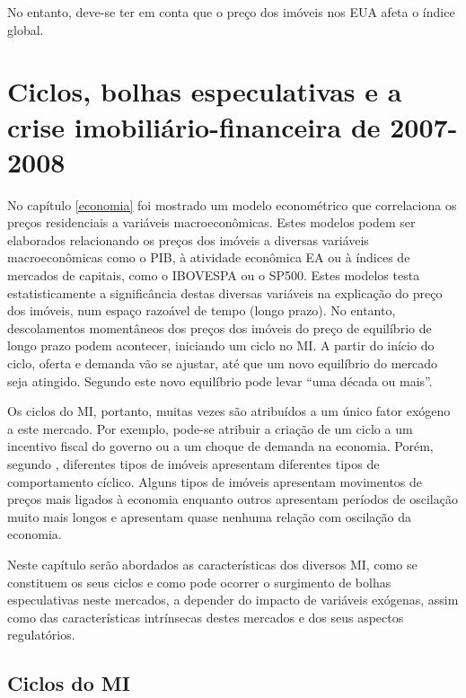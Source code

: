 \documentclass[
	12pt,				%
	oneside,			%
	a4paper,			%
	chapter=TITLE,		%
	section=TITLE,		%
	english,			%
	brazil				%
	]{abntex2}
\begin{document}
No entanto, deve-se ter em conta que o preço dos imóveis nos EUA afeta o índice
global.

\hypertarget{crise2008}{%
\chapter{Ciclos, bolhas especulativas e a crise imobiliário-financeira de 2007-2008}\label{crise2008}}

No capítulo \ref{economia} foi mostrado um modelo econométrico que correlaciona
os preços residenciais a variáveis macroeconômicas. Estes modelos podem ser
elaborados relacionando os preços dos imóveis a diversas variáveis
macroeconômicas como o \gls{PIB}, à atividade econômica \gls{EA} ou à índices de
mercados de capitais, como o \gls{IBOVESPA} ou o \gls{SP500}. Estes modelos
testa estatisticamente a significância destas diversas variáveis na explicação
do preço dos imóveis, num espaço razoável de tempo (longo prazo). No entanto,
descolamentos momentâneos dos preços dos imóveis do preço de equilíbrio de
longo prazo podem acontecer, iniciando um ciclo no \gls{MI}. A partir do início
do ciclo, oferta e demanda vão se ajustar, até que um novo equilíbrio do mercado
seja atingido. Segundo \textcite[p.~18]{regulation} este novo equilíbrio pode levar ``uma
década ou mais''.

Os ciclos do \gls{MI}, portanto, muitas vezes são atribuídos a um único fator
exógeno a este mercado. Por exemplo, pode-se atribuir a criação de um ciclo a um
incentivo fiscal do governo ou a um choque de demanda na economia. Porém,
segundo \textcite[p.~209-210]{wheaton1999}, diferentes tipos de imóveis apresentam
diferentes tipos de comportamento cíclico. Alguns tipos de imóveis apresentam
movimentos de preços mais ligados à economia enquanto outros apresentam períodos
de oscilação muito mais longos e apresentam quase nenhuma relação com oscilação
da economia.

Neste capítulo serão abordados as características dos diversos \gls{MI}, como
se constituem os seus ciclos e como pode ocorrer o surgimento de bolhas
especulativas neste mercados, a depender do impacto de variáveis exógenas, assim
como das características intrínsecas destes mercados e dos seus aspectos
regulatórios.

\hypertarget{ciclos-do}{%
\section{\texorpdfstring{Ciclos do \gls{MI}}{Ciclos do }}\label{ciclos-do}}
\end{document}
